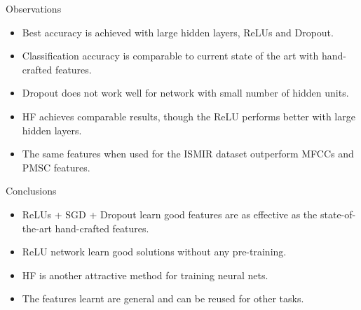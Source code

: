 \documentclass{beamer}
\begin{document}
\begin{frame}{Observations}
\begin{itemize}
    \item Best accuracy is achieved with large hidden layers, ReLUs and Dropout.
    \item Classification accuracy is comparable to current state of the art with hand-crafted features. 
    \item Dropout does not work well for network with small number of hidden units. 
    \item HF achieves comparable results, though the ReLU performs better with large hidden layers. 
    \item The same features when used for the ISMIR dataset outperform MFCCs and PMSC features. 
\end{itemize}
\end{frame}

\begin{frame}{Conclusions}
\begin{itemize}
    \item ReLUs + SGD + Dropout learn good features are as effective as the state-of-the-art hand-crafted features.
    \item ReLU network learn good solutions without any pre-training. 
    \item HF is another attractive method for training neural nets. 
    \item The features learnt are general and can be reused for other tasks. 
\end{itemize}
\end{frame}
\end{document}
